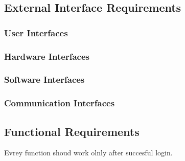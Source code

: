 \subsection{External Interface Requirements}
\subsubsection{User Interfaces}
\subsubsection{Hardware Interfaces}
\subsubsection{Software Interfaces}
\subsubsection{Communication Interfaces}


\subsection{Functional  Requirements}
Evrey function shoud work olnly after succesful login.


